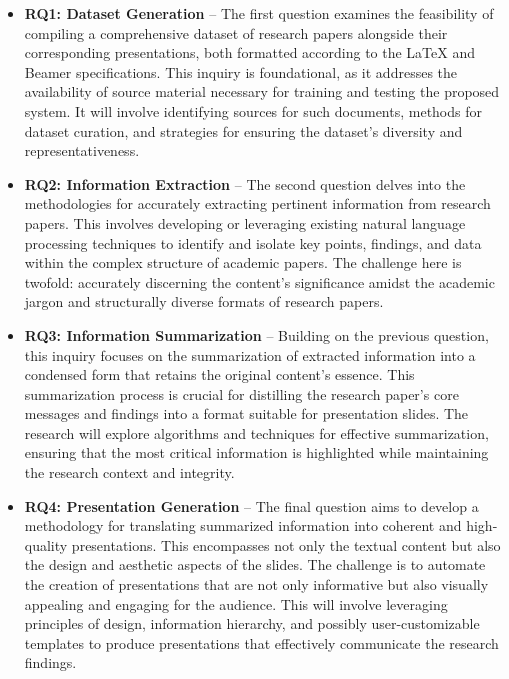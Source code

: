 \begin{itemize}
  \item \textbf{RQ1: Dataset Generation} – The first question examines the feasibility of compiling a comprehensive dataset of research papers alongside their corresponding presentations, both formatted according to the \LaTeX{} and Beamer specifications. This inquiry is foundational, as it addresses the availability of source material necessary for training and testing the proposed system. It will involve identifying sources for such documents, methods for dataset curation, and strategies for ensuring the dataset's diversity and representativeness.
  
  \item \textbf{RQ2: Information Extraction} – The second question delves into the methodologies for accurately extracting pertinent information from research papers. This involves developing or leveraging existing natural language processing techniques to identify and isolate key points, findings, and data within the complex structure of academic papers. The challenge here is twofold: accurately discerning the content's significance amidst the academic jargon and structurally diverse formats of research papers.
  
  \item \textbf{RQ3: Information Summarization} – Building on the previous question, this inquiry focuses on the summarization of extracted information into a condensed form that retains the original content's essence. This summarization process is crucial for distilling the research paper's core messages and findings into a format suitable for presentation slides. The research will explore algorithms and techniques for effective summarization, ensuring that the most critical information is highlighted while maintaining the research context and integrity.
  
  \item \textbf{RQ4: Presentation Generation} – The final question aims to develop a methodology for translating summarized information into coherent and high-quality presentations. This encompasses not only the textual content but also the design and aesthetic aspects of the slides. The challenge is to automate the creation of presentations that are not only informative but also visually appealing and engaging for the audience. This will involve leveraging principles of design, information hierarchy, and possibly user-customizable templates to produce presentations that effectively communicate the research findings.
\end{itemize}

